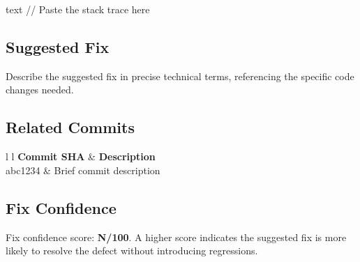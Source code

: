 
\begin{wyrdcode}{text}
// Paste the stack trace here
\end{wyrdcode}

\subsection{Suggested Fix}


\begin{technicaldetail}
Describe the suggested fix in precise technical terms, referencing
the specific code changes needed.
\end{technicaldetail}

\subsection{Related Commits}


\begin{wyrdtab}{l l}
\textbf{Commit SHA} & \textbf{Description} \\
abc1234             & Brief commit description \\
\end{wyrdtab}

\subsection{Fix Confidence}


\begin{callout}
Fix confidence score: \textbf{N/100}. A higher score indicates
the suggested fix is more likely to resolve the defect without
introducing regressions.
\end{callout}
